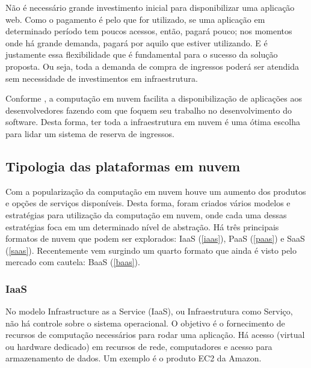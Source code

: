 Não é necessário grande investimento inicial para disponibilizar uma aplicação web.
Como o pagamento é pelo que for utilizado, se uma aplicação em determinado período tem
poucos acessos, então, pagará pouco; nos momentos onde há grande demanda, pagará por aquilo
que estiver utilizando. E é justamente essa flexibilidade que é fundamental para o sucesso
da solução proposta. Ou seja, toda a demanda de compra de ingressos poderá ser atendida
sem necessidade de investimentos em infraestrutura.

Conforme \cite{types-of-cloud-computing}, a computação em nuvem facilita a disponibilização
de aplicações aos desenvolvedores fazendo com que foquem seu trabalho no desenvolvimento
do software.
Desta forma, ter toda a infraestrutura em nuvem é uma ótima escolha para lidar um sistema
de reserva de ingressos.


\subsection{Tipologia das plataformas em nuvem}\label{tipologia-das-plataformas-em-nuvem}

Com a popularização da computação em nuvem houve um aumento dos produtos e opções de
serviços disponíveis.
Desta forma, foram criados vários modelos e estratégias para utilização da computação
em nuvem, onde cada uma dessas estratégias foca em um determinado nível de abstração.
Há três principais formatos de nuvem que podem ser explorados:
IaaS (\autoref{iaas}), PaaS (\autoref{paas}) e SaaS (\autoref{saas}).
Recentemente vem surgindo um quarto formato que ainda é visto pelo mercado com
cautela: BaaS (\autoref{baas}).




\subsubsection{IaaS}\label{iaas}

No modelo Infrastructure as a Service (IaaS), ou Infraestrutura como Serviço,
não há controle sobre o sistema operacional. O objetivo é o fornecimento
de recursos de computação necessários para rodar uma aplicação. Há acesso (virtual
ou hardware dedicado) em recursos de rede, computadores e acesso para armazenamento
de dados.
Um exemplo é o produto EC2 da Amazon.

